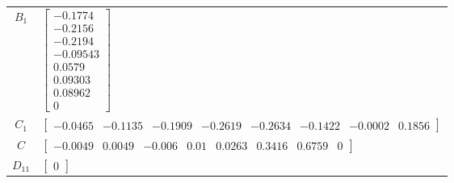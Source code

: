 \begin{tabular}{cl}
 $B_{1}$  & $\left[\begin{matrix}-0.1774\\-0.2156\\-0.2194\\-0.09543\\0.0579\\0.09303\\0.08962\\0\end{matrix}\right]$                                                                                                                                                                                                                                                                                                                                                                                                                                                                                                                                \\
 $C_{1}$  & $\left[\begin{matrix}-0.0465 & -0.1135 & -0.1909 & -0.2619 & -0.2634 & -0.1422 & -0.0002 & 0.1856\end{matrix}\right]$                                                                                                                                                                                                                                                                                                                                                                                                                                                                                                                    \\
   $C$    & $\left[\begin{matrix}-0.0049 & 0.0049 & -0.006 & 0.01 & 0.0263 & 0.3416 & 0.6759 & 0\end{matrix}\right]$                                                                                                                                                                                                                                                                                                                                                                                                                                                                                                                                 \\
 $D_{11}$ & $\left[\begin{matrix}0\end{matrix}\right]$                                                                                                                                                                                                                                                                                                                                                                                                                                                                                                                                                                                               \\

\end{tabular}
